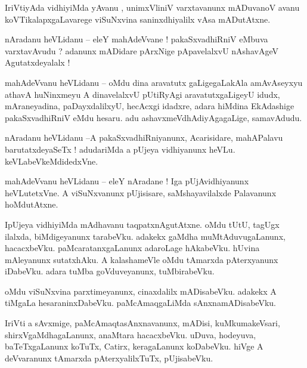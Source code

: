 \documentclass{article}
\begin{document}
\begin{mn}%
IriVtiyAda vidhiyiMda yAvanu , unimxVliniV varxtavanunx mADuvanoV avanu koVTikalapxgaLavarege 
viSuNxvina saninxdhiyalilx vAsa mADutAtxne.
\end{mn}


\begin{mn}%
nAradanu heVLidanu -- eleY mahAdeVvane ! pakaSxvadhiRniV eMbuva varxtavAvudu ? adanunx mADidare 
pArxNige pApavelalxvU nAshavAgeV Agutatxdeyalalx !
\end{mn}

\begin{mn}%
mahAdeVvanu heVLidanu -- oMdu dina aravatutx gaLigegaLakAla amAvAseyxyu athavA huNinxmeyu A 
dinavelalxvU pUtiRyAgi aravatutxgaLigeyU idudx, mAraneyadina, paDayxdalilxyU, hecAcxgi idadxre, 
adara hiMdina EkAdashige pakaSxvadhiRniV eMdu hesaru. adu ashavxmeVdhAdiyAgagaLige, samavAdudu.
\end{mn}

\begin{mn}%
nAradanu heVLidanu --A pakaSxvadhiRniyanunx, Acarisidare, mahAPalavu barutatxdeyaSeTx ! adudariMda 
a pUjeya vidhiyanunx heVLu. keVLabeVkeMdidedxVne.
\end{mn}

\begin{mn}%
mahAdeVvanu heVLidanu -- eleY nAradane ! Iga pUjAvidhiyanunx heVLutetxVne. A viSuNxvanunx 
pUjisisare, saMshayavilalxde Palavanunx hoMdutAtxne.
\end{mn}

\begin{mn}%
IpUjeya vidhiyiMda mAdhavanu taqpatxnAgutAtxne. oMdu tUtU, tagUgx ilalxda, biMdigeyanunx tarabeVku. 
adakekx gaMdha muMtAduvugaLanunx, hacacxbeVku. paMcaratanxgaLanunx adaroLage hAkabeVku. hUvina 
mAleyanunx sutatxhAku. A kalashameVle oMdu tAmarxda pAterxyanunx iDabeVku. adara tuMba 
goVduveyanunx, tuMbirabeVku.
\end{mn}

\begin{mn}%
oMdu viSuNxvina parxtimeyanunx, cinaxdalilx mADisabeVku. adakekx A tiMgaLa hesaraninxDabeVku. 
paMcAmaqgaLiMda sAnxnamADisabeVku.
\end{mn}

\begin{mn}%
IriVti a sAvxmige, paMcAmaqtasAnxnavanunx, mADisi, kuMkumakeVsari, shirxVgaMdhagaLanunx, anaMtara 
hacacxbeVku. uDuva, hodeyuva, baTeTxgaLanunx koTuTx, Catirx, keragaLanunx koDabeVku. hiVge A 
deVvaranunx tAmarxda pAterxyalilxTuTx, pUjisabeVku.
\end{mn}
\end{document}
